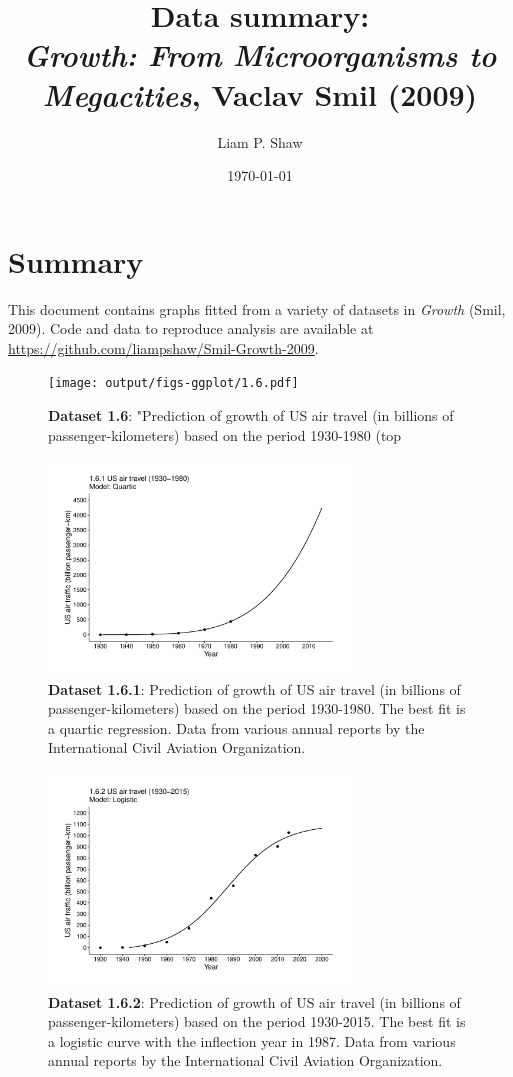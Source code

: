 \documentclass[aps,rmp,preprint,superscriptaddress,10pt,onecolumn]{article}
\begin{document}
\title{Data summary:\\\textit{Growth: From Microorganisms to Megacities}, Vaclav Smil (2009)}
\author{Liam P. Shaw}
\date{\today}


\maketitle

\section*{Summary}

\noindent This document contains graphs fitted from a variety of datasets in \textit{Growth} (Smil, 2009). Code and data to reproduce analysis are available at \url{https://github.com/liampshaw/Smil-Growth-2009}. 
\begin{figure}[h]
\texttt{[image: output/figs-ggplot/1.6.pdf]}
\caption{\textbf{Dataset 1.6}: "Prediction of growth of US air travel (in billions of passenger-kilometers) based on the period 1930-1980 (top}
\end{figure}
	
\begin{figure}[h]
\includegraphics[width=8cm]{output/figs-ggplot/1.6.1.pdf}
\caption{\textbf{Dataset 1.6.1}: Prediction of growth of US air travel (in billions of passenger-kilometers) based on the period 1930-1980. The best fit is a quartic regression. Data from various annual reports by the International Civil Aviation Organization. }
\end{figure}
	
\begin{figure}[h]
\includegraphics[width=8cm]{output/figs-ggplot/1.6.2.pdf}
\caption{\textbf{Dataset 1.6.2}: Prediction of growth of US air travel (in billions of passenger-kilometers) based on the period 1930-2015. The best fit is a logistic curve with the inflection year in 1987. Data from various annual reports by the International Civil Aviation Organization. }
\end{figure}
	
\end{document}
